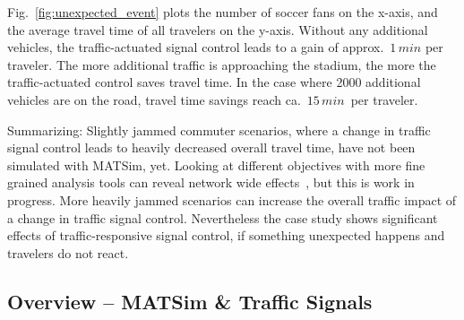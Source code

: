 Fig.~\ref{fig:unexpected_event} plots the number of soccer fans on
the x-axis, and the average travel time of all travelers on the
y-axis. Without any additional vehicles,
the traffic-actuated signal control leads to a gain of
approx.~$1 \, min$ per traveler.
The more additional traffic is approaching the stadium, the more the traffic-actuated control saves travel time. In the case where 2000 additional vehicles are on the road, travel time savings reach ca.~$15\, min$~per traveler. 

Summarizing: Slightly jammed commuter scenarios, where a change in traffic signal control leads to heavily decreased overall travel time, have not been simulated with MATSim, yet. 
Looking at different objectives with more fine grained analysis tools can reveal network wide effects~\citep[e.g.~see the analysis using macroscopic fundamental diagrams][pp.114]{Grether2014PhD}, but this is work in progress.  
More heavily jammed scenarios can increase the overall traffic impact of a change in traffic signal control. Nevertheless the case study shows significant effects of traffic-responsive signal control, if something unexpected happens and travelers do not react.  

\subsection{Overview -- MATSim \& Traffic Signals}


